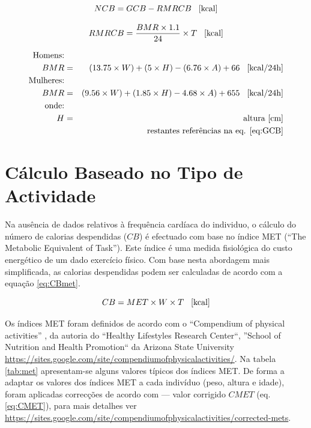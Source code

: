 \documentclass[a4paper,10pt]{report}
\begin{document}
\begin{equation} \label{eq:NCB} 
NCB = GCB - RMRCB \text{\hspace*{0.3cm}[kcal]}
\end{equation}

\begin{equation} \label{eq:RMRCB} 
RMRCB = \frac{BMR \times 1.1}{24} \times T \text{\hspace*{0.3cm}[kcal]}
\end{equation}

\begin{eqnarray} \label{eq:BMR}
\text{Homens:}&&\\
BMR &=& (13.75 \times W) + (5 \times H) - (6.76 \times A) + 66 \text{\hspace*{0.3cm}[kcal/24h]}\nonumber\\
\text{Mulheres:}&&\nonumber\\ 
BMR &=& (9.56 \times W) + (1.85 \times H) - 4.68 \times A) + 655 \text{\hspace*{0.3cm}[kcal/24h]}\nonumber\\
\text{onde:}&& \nonumber\\
H &=& \text{altura [cm]}\nonumber\\ 
&&\text{restantes referências na eq. \ref{eq:GCB}}\nonumber
\end{eqnarray}

\section{Cálculo Baseado no Tipo de Actividade}
\label{sec:caloriasMet}
Na ausência de dados relativos à frequência cardíaca do individuo, o cálculo do número de calorias despendidas ($CB$) é efectuado com base 
no índice MET (``The Metabolic Equivalent of Task''). Este índice é uma medida fisiológica do custo energético de um dado exercício físico.
Com base nesta abordagem mais simplificada, as calorias despendidas podem ser calculadas de acordo com a equação \ref{eq:CBmet}.

\begin{equation} \label{eq:CBmet} 
CB = MET \times W \times T \text{\hspace*{0.3cm}[kcal]}
\end{equation}

Os índices MET foram definidos de acordo com o ``Compendium of physical activities'' \cite{compendium}, da autoria do ``Healthy Lifestyles Research Center``, 
''School of Nutrition and Health Promotion`` da Arizona State University \url{https://sites.google.com/site/compendiumofphysicalactivities/}.
Na tabela \ref{tab:met} apresentam-se alguns valores típicos dos índices MET. 
De forma a adaptar os valores dos índices MET a cada indivíduo (peso, altura e idade), foram aplicadas correcções de acordo com \cite{NCB} --- 
valor corrigido $CMET$ (eq. \ref{eq:CMET}), para mais detalhes ver \url{https://sites.google.com/site/compendiumofphysicalactivities/corrected-mets}.
\end{document}
